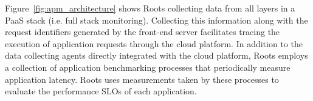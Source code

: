 Figure~\ref{fig:apm_architecture} shows Roots collecting data from all
layers in a PaaS stack (i.e. full stack monitoring). 
%
%
Collecting this information along with the request identifiers generated by the
front-end server
facilitates tracing the execution of application requests through the cloud platform. In addition
to the data collecting agents directly integrated with the cloud platform, Roots employs
a collection of application benchmarking processes that periodically measure
application latency. Roots uses measurements taken by these processes to
evaluate the performance SLOs of each application.

